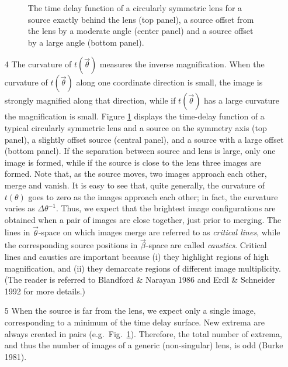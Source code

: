 \documentclass[a4paper,10pt]{article} %
\begin{document}
\begin{itemize}
\begin{figure}[ht] %
\begin{center}
\begin{minipage}[t]{0.6\hsize}
\end{minipage}
\end{center}
\caption{The time delay function of a circularly symmetric lens for a
  source exactly behind the lens (top panel), a source offset from the
  lens by a moderate angle (center panel) and a source offset by a
  large angle (bottom panel).}
\label{NB:fig3.3}
\end{figure}

\item[4] The curvature of $t(\vec\theta)$ measures the inverse
magnification. When the curvature of $t(\vec\theta)$ along one
coordinate direction is small, the image is strongly magnified along
that direction, while if $t(\vec\theta)$ has a large curvature the
magnification is small. Figure \ref{NB:fig3.3} displays the time-delay
function of a typical circularly symmetric lens and a source on the
symmetry axis (top panel), a slightly offset source (central panel),
and a source with a large offset (bottom panel). If the separation
between source and lens is large, only one image is formed, while if
the source is close to the lens three images are formed. Note that, as
the source moves, two images approach each other, merge and vanish. It
is easy to see that, quite generally, the curvature of $t(\theta)$
goes to zero as the images approach each other; in fact, the curvature
varies as $\Delta\theta^{-1}$. Thus, we expect that the brightest
image configurations are obtained when a pair of images are close
together, just prior to merging. The lines in $\vec\theta$-space on
which images merge are referred to as {\em critical lines\/}, while
the corresponding source positions in $\vec\beta$-space are called
{\em caustics\/}. Critical lines and caustics are important because
(i) they highlight regions of high magnification, and (ii) they
demarcate regions of different image multiplicity. (The reader is
referred to Blandford \& Narayan 1986 and Erdl \& Schneider 1992 for
more details.)

\item[5] When the source is far from the lens, we expect only a single
image, corresponding to a minimum of the time delay surface. New
extrema are always created in pairs (e.g.\ Fig.\
\ref{NB:fig3.3}). Therefore, the total number of extrema, and thus the
number of images of a generic (non-singular) lens, is odd (Burke
1981).

\end{itemize}
\end{document}
